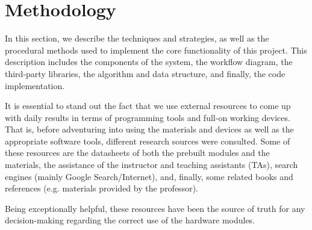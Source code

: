 %
%
%


\section{Methodology}
\label{sec:methodology}
In this section, we describe the techniques and strategies, as well as the procedural methods used to implement the core functionality of this project. This description includes the components of the system, the workflow diagram, the third-party libraries, the algorithm and data structure, and finally, the code implementation.

It is essential to stand out the fact that we use external resources to come up
with daily results in terms of programming tools and full-on working devices.
That is, before adventuring into using the materials and devices as well as the appropriate software tools, different research sources were consulted. Some of
these resources are the datasheets of both the prebuilt modules and the
materials, the assistance of the instructor and teaching assistants (TAs),
search engines (mainly Google Search/Internet), and, finally, some related books
and references (e.g. materials provided by the professor).

Being exceptionally helpful, these resources have been the source of truth for any decision-making regarding the correct use of the hardware modules.

